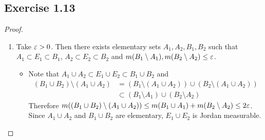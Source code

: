 \documentclass[hw_all.tex]{subfiles}
\begin{document}
\subsection{Exercise 1.13}

\begin{proof}
    \begin{enumerate}
        \item[(i)] 
            Take $\varepsilon > 0$. Then there exists elementary sets $A_1, A_2, B_1, B_2$ such that $A_1 \subset E_1 \subset B_1$, $A_2 \subset E_2 \subset B_2$ and $m(B_1 \setminus A_1), m(B_2 \setminus A_2) \leq \varepsilon$. 

            \begin{itemize}
                \item 
                    Note that $A_1 \cup A_2 \subset E_1 \cup E_2 \subset B_1 \cup B_2$ and
                    \begin{align*}
                        (B_1 \cup B_2) \setminus (A_1 \cup A_2) &= (B_1 \setminus (A_1 \cup A_2)) \cup (B_2 \setminus (A_1 \cup A_2)) \\
                                                                &\subset (B_1 \setminus A_1) \cup (B_2 \setminus A_2)
                    \end{align*}
                    Therefore $m((B_1 \cup B_2) \setminus (A_1 \cup A_2)) \leq m(B_1 \cup A_1) + m(B_2 \setminus A_2) \leq 2 \varepsilon$. Since $A_1 \cup A_2$ and $B_1 \cup B_2$ are elementary, $E_1 \cup E_2$ is Jordan measurable.


\end{itemize}
\end{enumerate}
\end{proof}
\end{document}
